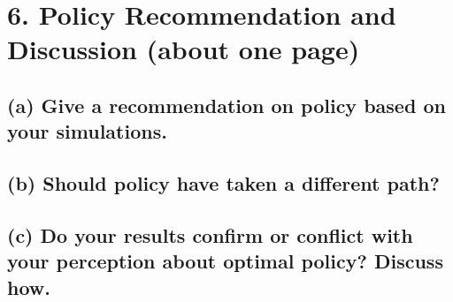 \documentclass[12pt]{article}
\begin{document}






\section*{6. Policy Recommendation and Discussion (about one page)}
\subsection*{(a) Give a recommendation on policy based on your simulations.}

\subsection*{(b) Should policy have taken a different path?}

\subsection*{(c) Do your results confirm or conflict with your perception about optimal policy? Discuss how.}

\appendix
\end{document}
